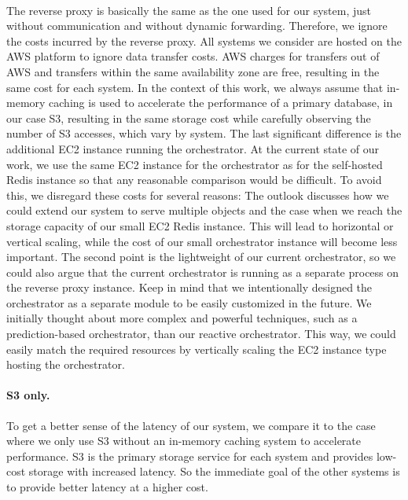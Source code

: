 ~\\
The reverse proxy is basically the same as the one used for our system, just without communication and without dynamic forwarding. Therefore, we ignore the costs incurred by the reverse proxy. All systems we consider are hosted on the AWS platform to ignore data transfer costs. AWS charges for transfers out of AWS and transfers within the same availability zone are free, resulting in the same cost for each system. In the context of this work, we always assume that in-memory caching is used to accelerate the performance of a primary database, in our case S3, resulting in the same storage cost while carefully observing the number of S3 accesses, which vary by system. The last significant difference is the additional EC2 instance running the orchestrator. At the current state of our work, we use the same EC2 instance for the orchestrator as for the self-hosted Redis instance so that any reasonable comparison would be difficult. To avoid this, we disregard these costs for several reasons: The outlook discusses how we could extend our system to serve multiple objects and the case when we reach the storage capacity of our small EC2 Redis instance. This will lead to horizontal or vertical scaling, while the cost of our small orchestrator instance will become less important. The second point is the lightweight of our current orchestrator, so we could also argue that the current orchestrator is running as a separate process on the reverse proxy instance. Keep in mind that we intentionally designed the orchestrator as a separate module to be easily customized in the future. We initially thought about more complex and powerful techniques, such as a prediction-based orchestrator, than our reactive orchestrator. This way, we could easily match the required resources by vertically scaling the EC2 instance type hosting the orchestrator.

\paragraph{S3 only.}
To get a better sense of the latency of our system, we compare it to the case where we only use S3 without an in-memory caching system to accelerate performance. S3 is the primary storage service for each system and provides low-cost storage with increased latency. So the immediate goal of the other systems is to provide better latency at a higher cost. 

